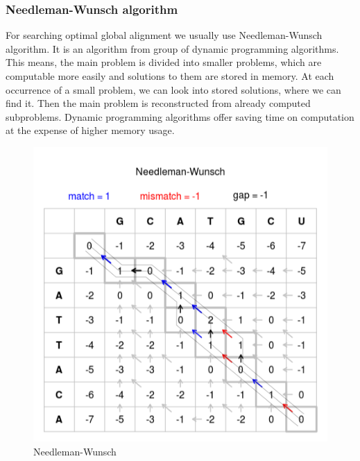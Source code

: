 
\subsubsection{Needleman-Wunsch algorithm}
For searching optimal global alignment we usually use Needleman-Wunsch algorithm.
It is an algorithm from group of dynamic programming algorithms.
This means, the main problem is divided into smaller problems, which are computable more easily and solutions to them are stored in memory.
At each occurrence of a small problem, we can look into stored solutions, where we can find it. 
Then the main problem is reconstructed from already computed subproblems.
Dynamic programming algorithms offer saving time on computation at the expense of higher memory usage.

\begin{figure}[ht]
  \centering
    \includegraphics[width=\textwidth]{./images/needle_wunsch.png}
  \caption{Needleman-Wunsch}
  \label{fig:glal}
\end{figure}

